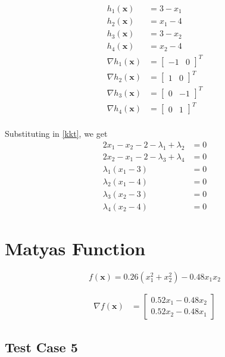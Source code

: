 \documentclass[a4paper]{article}
\begin{document}
\begin{align*}
h_1(\textbf{x}) &= 3 - x_1 \\
h_2(\textbf{x}) &= x_1 - 4 \\
h_3(\textbf{x}) &= 3 - x_2 \\
h_4(\textbf{x}) &= x_2 - 4 \\
\nabla h_1(\textbf{x}) &= \begin{bmatrix} -1 & 0 \end{bmatrix} ^T \\
\nabla h_2(\textbf{x}) &= \begin{bmatrix} 1 & 0 \end{bmatrix} ^T \\
\nabla h_3(\textbf{x}) &= \begin{bmatrix} 0 & -1 \end{bmatrix} ^T \\
\nabla h_4(\textbf{x}) &= \begin{bmatrix} 0 & 1 \end{bmatrix} ^T \\
\end{align*}

Substituting in \eqref{kkt}, we get
\begin{align*}
2 x_1 - x_2 - 2 - \lambda_1 + \lambda_2 &= 0 \\
2 x_2 - x_1 - 2 - \lambda_3 + \lambda_4 &= 0 \\
\lambda_1 (x_1 - 3) &= 0 \\
\lambda_2 (x_1 - 4) &= 0 \\
\lambda_3 (x_2 - 3) &= 0 \\
\lambda_4 (x_2 - 4) &= 0
\end{align*}

\section{Matyas Function}

$$f(\textbf{x}) = 0.26(x_1^2 + x_2^2) - 0.48 x_1 x_2$$

\begin{align*}
\nabla f(\textbf{x}) &=
    \begin{bmatrix}
        0.52 x_1 - 0.48 x_2 \\
        0.52 x_2 - 0.48 x_1
    \end{bmatrix}
\end{align*}

\subsection{Test Case 5}
\end{document}
